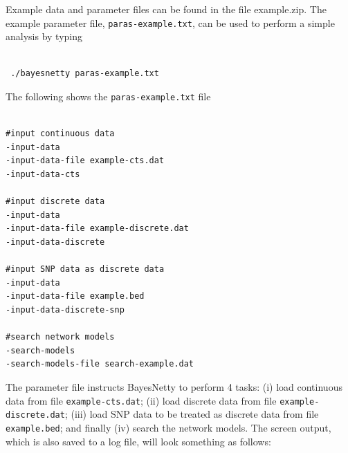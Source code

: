 \documentclass[a4paper,12pt]{article}
\newcommand{\code}[1]{{\footnotesize{{\tt #1}}}}
\begin{document}
Example data and parameter files can be found in the file example.zip. The example parameter file, \code{paras-example.txt}, can be used to perform a simple analysis by typing 
\vspace{0.35cm} \begin{lstlisting}

 ./bayesnetty paras-example.txt

\end{lstlisting} \vspace{0.35cm}
The following shows the \code{paras-example.txt} file 
\vspace{0.35cm} \begin{lstlisting}

#input continuous data
-input-data
-input-data-file example-cts.dat
-input-data-cts

#input discrete data
-input-data
-input-data-file example-discrete.dat
-input-data-discrete

#input SNP data as discrete data
-input-data
-input-data-file example.bed
-input-data-discrete-snp

#search network models
-search-models
-search-models-file search-example.dat

\end{lstlisting} \vspace{0.35cm}
The parameter file instructs BayesNetty to perform 4 tasks: (i) load continuous data from file \code{example-cts.dat}; (ii) load discrete data from file \code{example-discrete.dat}; (iii) load SNP data to be treated as discrete data from file \code{example.bed}; and finally (iv) search the network models. The screen output, which is also saved to a log file, will look something as follows: 
\end{document}
